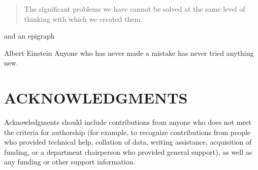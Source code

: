 \begin{quote}
      The significant problems we have cannot be solved at the same level of thinking with which we created them.
\end{quote}

\noindent and an epigraph

\begin{epigraph}{Albert Einstein}
      Anyone who has never made a mistake has never tried anything new.
\end{epigraph}


\section*{\normalsize{ACKNOWLEDGMENTS}}
Acknowledgments should include contributions from anyone who does not meet the criteria for authorship (for example, to recognize contributions from people who provided technical help, collation of data, writing assistance, acquisition of funding, or a department chairperson who provided general support), as well as any funding or other support information.


% 
